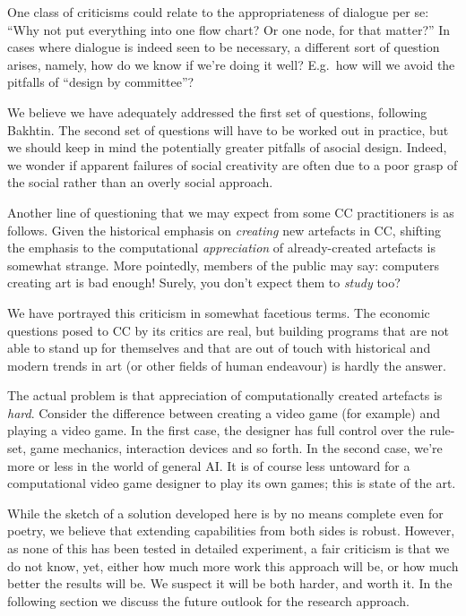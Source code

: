 One class of criticisms could relate to the appropriateness of
dialogue per se: ``Why not put everything into one flow chart?  Or one
node, for that matter?''  In cases where dialogue is indeed seen to be
necessary, a different sort of question arises, namely, how do we know
if we're doing it well?  E.g.~how will we avoid the pitfalls of
``design by committee''?

We believe we have adequately addressed the first set of questions,
following Bakhtin.  The second set of questions will have to be worked
out in practice, but we should keep in mind the potentially greater
pitfalls of asocial design.  Indeed, we wonder if apparent failures of
social creativity are often due to a poor grasp of the social rather
than an overly social approach.

Another line of questioning that we may expect from some CC
practitioners is as follows.  Given the historical emphasis on
\emph{creating} new artefacts in CC, shifting the emphasis to the
computational \emph{appreciation} of already-created artefacts is
somewhat strange.  More pointedly, members of the public may say:
computers creating art is bad enough!  Surely, you don't expect them
to \emph{study} too?

We have portrayed this criticism in somewhat facetious terms.  The
economic questions posed to CC by its critics are real, but building
programs that are not able to stand up for themselves and that are out
of touch with historical and modern trends in art (or other fields of
human endeavour) is hardly the answer.

The actual problem is that appreciation of computationally created
artefacts is \emph{hard}.  Consider the difference between creating a
video game (for example) and playing a video game.  In the first case,
the designer has full control over the rule-set, game mechanics,
interaction devices and so forth.  In the second case, we're more or
less in the world of general AI.  It is of course less untoward for a
computational video game designer to play its own games; this is state
of the art.

While the sketch of a solution developed here is by no means complete
even for poetry, we believe that extending capabilities from both
sides is robust.  However, as none of this has been tested in detailed
experiment, a fair criticism is that we do not know, yet, either how
much more work this approach will be, or how much better the results
will be.  We suspect it will be both harder, and worth it.  In the
following section we discuss the future outlook for the research approach.

